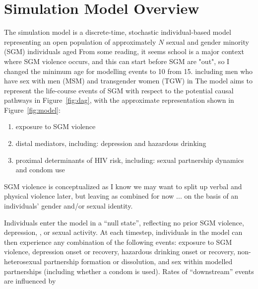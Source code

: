 \section{Simulation Model Overview}\label{mod.ov}
The simulation model is a discrete-time, stochastic individual-based model
representing an open population
of approximately $N$ sexual and gender minority (SGM) individuals aged
     {From some reading, it seems school is a major context where SGM violence occurs,
      and this can start before SGM are "out",
      so I changed the minimum age for modelling events to 10 from 15.}
including men who have sex with men (MSM) and transgender women (TGW) in
The model aims to represent the life-course events of SGM with respect to
the potential causal pathways in Figure~\ref{fig:dag},
with the approximate representation shown in Figure~\ref{fig:model}:
\begin{enumerate}[label=\roman*)]
  \item exposure to SGM violence
  \item distal mediators, including:
        depression and hazardous drinking
  \item proximal determinants of HIV risk, including:
        sexual partnership dynamics and condom use
\end{enumerate}
SGM violence is conceptualized as
     {I know we may want to split up verbal and physical violence later,
      but leaving as combined for now ...}
on the basis of an individuals' gender and/or sexual identity.
\par
Individuals enter the model in a ``null state'', reflecting
no prior SGM violence, depression, \hazdrink, or sexual activity.
At each timestep, individuals in the model can then experience
any combination of the following events:
exposure to SGM violence,
depression onset or recovery,
hazardous drinking onset or recovery,
non-heterosexual partnership formation or dissolution,
and sex within modelled partnerships (including whether a condom is used).
Rates of ``downstream'' events are influenced by
